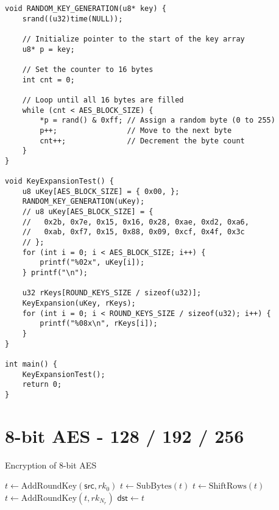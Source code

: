 \begin{lstlisting}[style=C, caption={Key Expansion Test},captionpos=t]
void RANDOM_KEY_GENERATION(u8* key) {
	srand((u32)time(NULL));
	
	// Initialize pointer to the start of the key array
	u8* p = key;
	
	// Set the counter to 16 bytes
	int cnt = 0;
	
	// Loop until all 16 bytes are filled
	while (cnt < AES_BLOCK_SIZE) {
		*p = rand() & 0xff; // Assign a random byte (0 to 255) 
		p++;                // Move to the next byte
		cnt++;              // Decrement the byte count
	}
}

void KeyExpansionTest() {
	u8 uKey[AES_BLOCK_SIZE] = { 0x00, };
	RANDOM_KEY_GENERATION(uKey);
	// u8 uKey[AES_BLOCK_SIZE] = { 
	// 	 0x2b, 0x7e, 0x15, 0x16, 0x28, 0xae, 0xd2, 0xa6,
	//	 0xab, 0xf7, 0x15, 0x88, 0x09, 0xcf, 0x4f, 0x3c
	// };
	for (int i = 0; i < AES_BLOCK_SIZE; i++) {
		printf("%02x", uKey[i]);
	} printf("\n");
	
	u32 rKeys[ROUND_KEYS_SIZE / sizeof(u32)];
	KeyExpansion(uKey, rKeys);
	for (int i = 0; i < ROUND_KEYS_SIZE / sizeof(u32); i++) {
		printf("%08x\n", rKeys[i]);
	}
}

int main() {
	KeyExpansionTest();
	return 0;
}
\end{lstlisting}

\newpage
\section{8-bit AES - 128 / 192 / 256}

\begin{algorithm}[H]
	\caption{Encryption of 8-bit AES}
	
	\BlankLine
	$t \leftarrow \text{AddRoundKey}(\mathsf{src}, rk_0)$
	$t \leftarrow \text{SubBytes}(t)$\;
	$t \leftarrow \text{ShiftRows}(t)$\;
	$t \leftarrow \text{AddRoundKey}(t, rk_{N_r})$\;
	$\mathsf{dst} \leftarrow t$\;
	\;
\end{algorithm}

